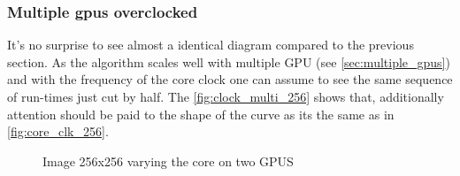 \subsubsection{Multiple gpus overclocked} %
\label{ssub:multiple_gpus_overclocked}
It's no surprise to see almost a identical diagram compared to the previous
section. As the algorithm scales well with multiple \gls{GPU} (see
\autoref{sec:multiple_gpus}) and with the frequency of the core clock one can 
assume to see the same sequence of run-times just cut by half. The
\autoref{fig:clock_multi_256} shows that, additionally attention should be paid
to the shape of the curve as its the same as in \autoref{fig:core_clk_256}. 

\begin{figure}[ht]
  \centering



  \tableA

 \label{fig:clock_multi_256}%
 \caption{Image 256x256 varying the core on two GPUS}
\end{figure}

